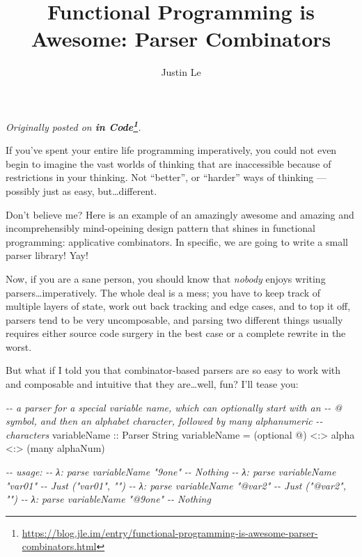 \documentclass[]{article}
\title{Functional Programming is Awesome: Parser Combinators}
\author{Justin Le}
\newenvironment{Shaded}{}{}
\newcommand{\CharTok}[1]{\textcolor[rgb]{0.25,0.44,0.63}{#1}}
\newcommand{\CommentTok}[1]{\textcolor[rgb]{0.38,0.63,0.69}{\textit{#1}}}
\newcommand{\DataTypeTok}[1]{\textcolor[rgb]{0.56,0.13,0.00}{#1}}
\newcommand{\NormalTok}[1]{#1}
\newcommand{\OperatorTok}[1]{\textcolor[rgb]{0.40,0.40,0.40}{#1}}
\newcommand{\OtherTok}[1]{\textcolor[rgb]{0.00,0.44,0.13}{#1}}
\renewcommand{\href}[2]{#2\footnote{\url{#1}}}
\begin{document}
\maketitle

\emph{Originally posted on
\textbf{\href{https://blog.jle.im/entry/functional-programming-is-awesome-parser-combinators.html}{in
Code}}.}

If you've spent your entire life programming imperatively, you could not even
begin to imagine the vast worlds of thinking that are inaccessible because of
restrictions in your thinking. Not ``better'', or ``harder'' ways of thinking
--- possibly just as easy, but\ldots different.

Don't believe me? Here is an example of an amazingly awesome and amazing and
incomprehensibly mind-opeining design pattern that shines in functional
programming: applicative combinators. In specific, we are going to write a small
parser library! Yay!

Now, if you are a sane person, you should know that \emph{nobody} enjoys writing
parsers\ldots imperatively. The whole deal is a mess; you have to keep track of
multiple layers of state, work out back tracking and edge cases, and to top it
off, parsers tend to be very uncomposable, and parsing two different things
usually requires either source code surgery in the best case or a complete
rewrite in the worst.

But what if I told you that combinator-based parsers are so easy to work with
and composable and intuitive that they are\ldots well, fun? I'll tease you:

\begin{Shaded}
\begin{Highlighting}[]
\CommentTok{{-}{-} a parser for a special variable name, which can optionally start with an}
\CommentTok{{-}{-} \textasciigrave{}@\textasciigrave{} symbol, and then an alphabet character, followed by many alphanumeric}
\CommentTok{{-}{-} characters}
\OtherTok{variableName ::} \DataTypeTok{Parser} \DataTypeTok{String}
\NormalTok{variableName }\OtherTok{=}\NormalTok{ (optional }\CharTok{\textquotesingle{}@\textquotesingle{}}\NormalTok{) }\OperatorTok{<:>}\NormalTok{ alpha }\OperatorTok{<:>}\NormalTok{ (many alphaNum)}

\CommentTok{{-}{-} usage:}
\CommentTok{{-}{-} λ: parse variableName "9one"}
\CommentTok{{-}{-} Nothing}
\CommentTok{{-}{-} λ: parse variableName "var01"}
\CommentTok{{-}{-} Just ("var01", "")}
\CommentTok{{-}{-} λ: parse variableName "@var2"}
\CommentTok{{-}{-} Just ("@var2", "")}
\CommentTok{{-}{-} λ: parse variableName "@9one"}
\CommentTok{{-}{-} Nothing}
\end{Highlighting}
\end{Shaded}
\end{document}
